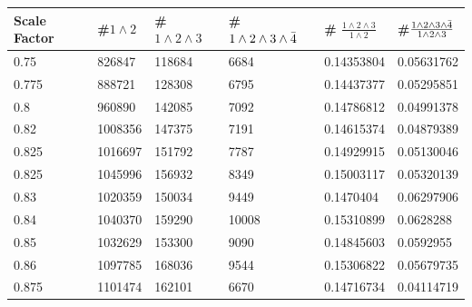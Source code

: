 \documentclass[11pt,a4paper]{article}
\begin{document}
\begin{table}[]
\centering
\begin{tabular}{|l|l|l|l|l|l|}
\hline
Scale Factor & \#$1 \land 2$ &\# $1 \land 2 \land 3$ &\# $1 \land 2 \land 3 \land \Bar{4}$ &\# $\frac{1 \land 2 \land 3}{1 \land 2}$ & \#$\frac{1 \land 2 \land 3 \land \Bar{4}}{1 \land 2 \land 3}$ \\ \hline
0.75         & 826847      & 118684              & 6684                              & 0.14353804                            & 0.05631762                  \\ \hline
0.775        & 888721      & 128308              & 6795                              & 0.14437377                            & 0.05295851                  \\ \hline
0.8          & 960890      & 142085              & 7092                              & 0.14786812                            & 0.04991378                  \\ \hline
0.82         & 1008356     & 147375              & 7191                              & 0.14615374                            & 0.04879389                  \\ \hline
0.825        & 1016697     & 151792              & 7787                              & 0.14929915                            & 0.05130046                  \\ \hline
0.825        & 1045996     & 156932              & 8349                              & 0.15003117                            & 0.05320139                  \\ \hline
0.83         & 1020359     & 150034              & 9449                              & 0.1470404                             & 0.06297906                  \\ \hline
0.84         & 1040370     & 159290              & 10008                             & 0.15310899                            & 0.0628288                   \\ \hline
0.85         & 1032629     & 153300              & 9090                              & 0.14845603                            & 0.0592955                   \\ \hline
0.86         & 1097785     & 168036              & 9544                              & 0.15306822                            & 0.05679735                  \\ \hline
0.875        & 1101474     & 162101              & 6670                              & 0.14716734                            & 0.04114719                  \\ \hline

\end{tabular}
\end{table}
\end{document}
